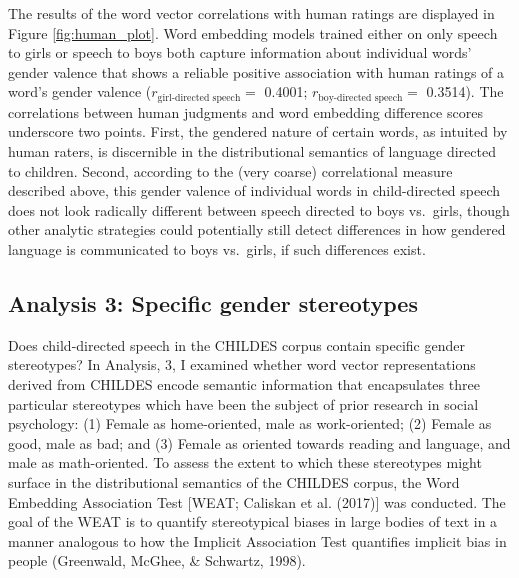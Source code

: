 \documentclass[10pt, letterpaper]{article}
\begin{document}
The results of the word vector correlations with human ratings are
displayed in Figure \ref{fig:human_plot}. Word embedding models trained
either on only speech to girls or speech to boys both capture
information about individual words' gender valence that shows a reliable
positive association with human ratings of a word's gender valence
(\(r_\text{girl-directed speech} =\) 0.4001;
\(r_\text{boy-directed speech}=\) 0.3514). The correlations between
human judgments and word embedding difference scores underscore two
points. First, the gendered nature of certain words, as intuited by
human raters, is discernible in the distributional semantics of language
directed to children. Second, according to the (very coarse)
correlational measure described above, this gender valence of individual
words in child-directed speech does not look radically different between
speech directed to boys vs.~girls, though other analytic strategies
could potentially still detect differences in how gendered language is
communicated to boys vs.~girls, if such differences exist.

\hypertarget{analysis-3-specific-gender-stereotypes}{%
\subsection{Analysis 3: Specific gender
stereotypes}\label{analysis-3-specific-gender-stereotypes}}

Does child-directed speech in the CHILDES corpus contain specific gender
stereotypes? In Analysis, 3, I examined whether word vector
representations derived from CHILDES encode semantic information that
encapsulates three particular stereotypes which have been the subject of
prior research in social psychology: (1) Female as home-oriented, male
as work-oriented; (2) Female as good, male as bad; and (3) Female as
oriented towards reading and language, and male as math-oriented. To
assess the extent to which these stereotypes might surface in the
distributional semantics of the CHILDES corpus, the Word Embedding
Association Test {[}WEAT; Caliskan et al. (2017){]} was conducted. The
goal of the WEAT is to quantify stereotypical biases in large bodies of
text in a manner analogous to how the Implicit Association Test
quantifies implicit bias in people (Greenwald, McGhee, \& Schwartz,
1998).
\end{document}
